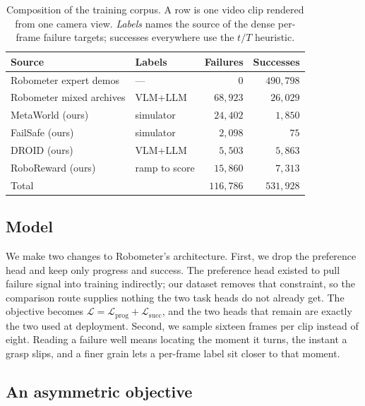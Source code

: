 \begin{table}[t]
\centering
\small
\caption{Composition of the training corpus. A row is one video clip rendered
from one camera view. \emph{Labels} names the source of the dense per-frame
failure targets; successes everywhere use the $t/T$ heuristic.}
\label{tab:data}
\begin{tabular}{@{}llrr@{}}
\toprule
Source & Labels & Failures & Successes \\
\midrule
Robometer expert demos      & ---                & $0$      & $490{,}798$ \\
Robometer mixed archives    & VLM+LLM            & $68{,}923$ & $26{,}029$ \\
MetaWorld (ours)            & simulator          & $24{,}402$ & $1{,}850$ \\
FailSafe (ours)             & simulator          & $2{,}098$  & $75$ \\
DROID (ours)                & VLM+LLM            & $5{,}503$  & $5{,}863$ \\
RoboReward (ours)           & ramp to score      & $15{,}860$ & $7{,}313$ \\
\midrule
Total                       &                    & $116{,}786$ & $531{,}928$ \\
\bottomrule
\end{tabular}
\end{table}

\subsection{Model}
\label{sec:method-arch}

We make two changes to Robometer's architecture. First, we drop the preference
head and keep only progress and success. The preference head existed to pull
failure signal into training indirectly; our dataset removes that constraint, so
the comparison route supplies nothing the two task heads do not already get. The
objective becomes $\mathcal{L} = \mathcal{L}_{\mathrm{prog}} +
\mathcal{L}_{\mathrm{succ}}$, and the two heads that remain are exactly the two
used at deployment. Second, we sample sixteen frames per clip instead of eight.
Reading a failure well means locating the moment it turns, the instant a grasp
slips, and a finer grain lets a per-frame label sit closer to that moment.

\subsection{An asymmetric objective}
\label{sec:method-loss}

